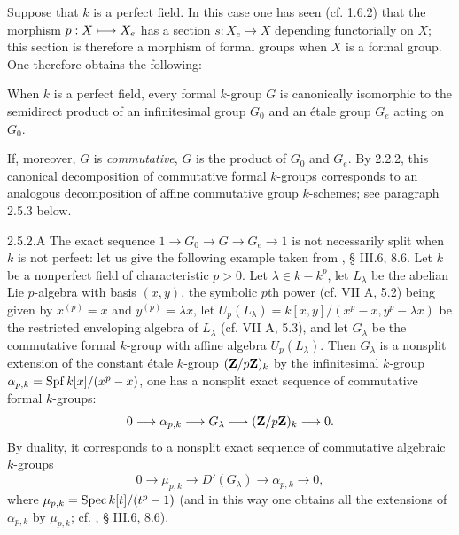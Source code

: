 Suppose that $k$ is a perfect field. In this case one has seen (cf. 1.6.2) that the morphism $p:X\longmapsto X_e$ has a section $s:X_e\to X$ depending functorially on $X$; this section is therefore a morphism of formal groups when $X$ is a formal group. One therefore obtains the following:
\begin{proposition}{}
When $k$ is a perfect field, every formal $k$-group $G$ is canonically isomorphic to the semidirect product of an infinitesimal group $G_0$ and an étale group $G_e$ acting on $G_0$.
\end{proposition}
If, moreover, $G$ is \emph{commutative}, $G$ is the product of $G_0$ and $G_e$. By 2.2.2, this canonical decomposition of commutative formal $k$-groups corresponds to an analogous decomposition of affine commutative group $k$-schemes; see paragraph 2.5.3 below.
\begin{remark}{2.5.2.A}\label{VIIB.2.5.2.A}
The exact sequence $1\to G_0\to G\to G_e\to1$ is not necessarily split when $k$ is not perfect: let us give the following example taken from \cite{DG70}, § III.6, 8.6. Let $k$ be a nonperfect field of characteristic $p>0$. Let $\lambda\in k-k^p$, let $L_\lambda$ be the abelian Lie $p$-algebra with basis $(x,y)$, the symbolic $p$th power (cf. VII A, 5.2) being given by $x^{(p)}=x$ and $y^{(p)}=\lambda x$, let $U_p(L_\lambda)=k[x,y]/(x^p-x,y^p-\lambda x)$ be the restricted enveloping algebra of $L_\lambda$ (cf. VII A, 5.3), and let $G_\lambda$ be the commutative formal $k$-group with affine algebra $U_p(L_\lambda)$. Then $G_\lambda$ is a nonsplit extension of the constant étale $k$-group $(\mathbf{Z}/p\mathbf{Z})_k$ by the infinitesimal $k$-group $\alpha_{p,k}=\operatorname{Spf} k[x]/(x^p-x)$, \ie one has a nonsplit exact sequence of commutative formal $k$-groups:
\[
0\longrightarrow\alpha_{p,k}\longrightarrow G_\lambda\longrightarrow(\mathbf{Z}/p\mathbf{Z})_k\longrightarrow0.
\]
By duality, it corresponds to a nonsplit exact sequence of commutative algebraic $k$-groups
\[
0\to\mu_{p,k}\to D'(G_\lambda)\to\alpha_{p,k}\to0,
\]
where $\mu_{p,k}=\operatorname{Spec} k[t]/(t^p-1)$ (and in this way one obtains all the extensions of $\alpha_{p,k}$ by $\mu_{p,k}$; cf. \cite{DG70}, § III.6, 8.6).
\end{remark}

